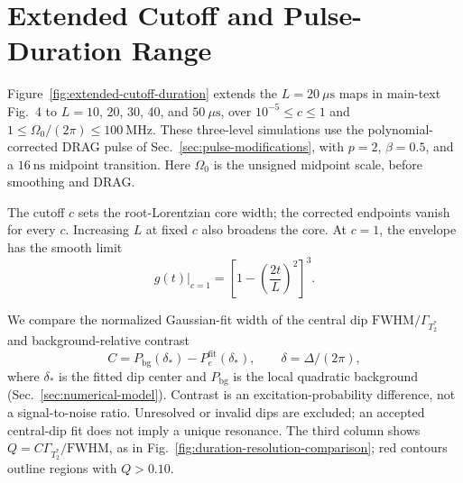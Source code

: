 \section{Extended Cutoff and Pulse-Duration Range}
\label{sec:extended-cutoff-duration}

Figure~\ref{fig:extended-cutoff-duration} extends the $L=20~\mu\mathrm{s}$
maps in main-text Fig.~4 to $L=10$, 20, 30, 40, and $50~\mu\mathrm{s}$,
over $10^{-5}\leq c\leq1$ and $1\leq\Omega_0/(2\pi)\leq100~\mathrm{MHz}$.
These three-level simulations use the polynomial-corrected DRAG pulse
of Sec.~\ref{sec:pulse-modifications}, with $p=2$, $\beta=0.5$, and a
$16~\mathrm{ns}$ midpoint transition. Here $\Omega_0$ is the unsigned
midpoint scale, before smoothing and DRAG.

The cutoff $c$ sets the root-Lorentzian core width; the corrected endpoints
vanish for every $c$. Increasing $L$ at fixed $c$ also broadens the core.
At $c=1$, the envelope has the smooth limit
\begin{equation}
    g(t)\big|_{c=1}=
    \left[1-\left(\frac{2t}{L}\right)^2\right]^3.
    \label{eq:extended-cutoff-one-limit}
\end{equation}

We compare the normalized Gaussian-fit width of the central dip
$\mathrm{FWHM}/\Gamma_{T_2^*}$ and background-relative contrast
\begin{equation}
    C=P_{\mathrm{bg}}(\delta_*)-P_e^{\mathrm{fit}}(\delta_*),
    \qquad \delta=\Delta/(2\pi),
    \label{eq:extended-cutoff-contrast}
\end{equation}
where $\delta_*$ is the fitted dip center and $P_{\mathrm{bg}}$ is the local
quadratic background (Sec.~\ref{sec:numerical-model}). Contrast is an excitation-probability
difference, not a signal-to-noise ratio. Unresolved or invalid dips are
excluded; an accepted central-dip fit does not imply a unique resonance.
The third column shows $Q=C\Gamma_{T_2^*}/\mathrm{FWHM}$, as in
Fig.~\ref{fig:duration-resolution-comparison}; red contours outline
regions with $Q>0.10$.

